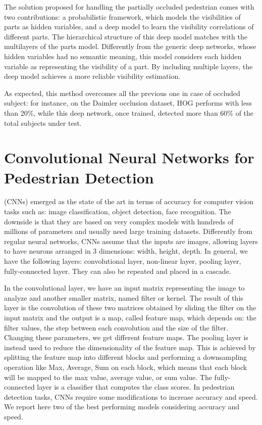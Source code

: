 \documentclass[10pt,journal,compsoc]{IEEEtran}
\begin{document}
The solution proposed for handling the partially occluded pedestrian comes with two contributions:
a probabilistic framework, which models the visibilities
of parts as hidden variables, and a deep model to learn the visibility correlations
of different parts. The hierarchical structure of this deep model matches with
the multilayers of the parts model. Differently from the generic deep networks,
whose hidden variables had no semantic meaning, this model considers each hidden
variable as representing the visibility of a part. By including multiple layers,
the deep model achieves a more reliable visibility estimation.

As expected, this method overcomes all the previous one in case of occluded
subject: for instance, on the Daimler occlusion dataset, HOG performs with less
than 20\%, while this deep network, once trained, detected more than 60\% of the
total subjects under test.

\section{Convolutional Neural Networks for Pedestrian Detection}
\label{sec:CNN}
 (CNNs) emerged as the state of the art in terms of
accuracy for computer vision tasks such as: image classification, object detection,
face recognition. The downside is that they are based on very complex models with
hundreds of millions of parameters and usually need large training datasets.
Differently from regular neural networks, CNNs assume that the inputs are images,
allowing layers to have neurons arranged in 3 dimensions: width, height, depth.
In general, we have the following layers: convolutional layer, non-linear layer,
pooling layer, fully-connected layer. They can also be repeated and placed in a cascade.

In the convolutional layer, we have an input matrix representing the image to analyze
and another smaller matrix, named filter or kernel. The result of this layer is the
convolution of these two matrices obtained by sliding the filter on the input matrix
and the output is a map, called feature map, which depends on: the filter values, the
step between each convolution and the size of the filter. Changing these parameters,
we get different feature maps. The pooling layer is instead used to reduce the dimensionality
of the feature map. This is achieved by splitting the feature map into different blocks
and performing a downsampling operation like Max, Average, Sum on each block, which
means that each block will be mapped to the max value, average value, or sum value.
The fully-connected layer is a classifier that computes the class scores.
In pedestrian detection tasks, CNNs require some modifications to increase accuracy
and speed. We report here two of the best performing models considering accuracy and speed.
\end{document}
